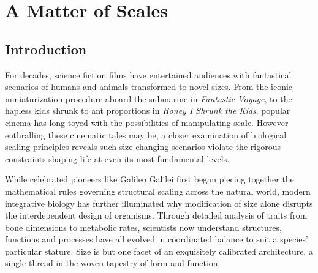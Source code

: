 \chapter{A Matter of Scales}
\label{ch:15}



\vspace{1cm}

\section{Introduction}

For decades, science fiction films have entertained audiences with fantastical scenarios of humans and animals transformed to novel sizes. From the iconic miniaturization procedure aboard the submarine in \emph{Fantastic Voyage}, to the hapless kids shrunk to ant proportions in \emph{Honey I Shrunk the Kids}, popular cinema has long toyed with the possibilities of manipulating scale. However enthralling these cinematic tales may be, a closer examination of biological scaling principles reveals such size-changing scenarios violate the rigorous constraints shaping life at even its most fundamental levels.

While celebrated pioneers like Galileo Galilei first began piecing together the mathematical rules governing structural scaling across the natural world, modern integrative biology has further illuminated why modification of size alone disrupts the interdependent design of organisms. Through detailed analysis of traits from bone dimensions to metabolic rates, scientists now understand structures, functions and processes have all evolved in coordinated balance to suit a species' particular stature. Size is but one facet of an exquisitely calibrated architecture, a single thread in the woven tapestry of form and function.

